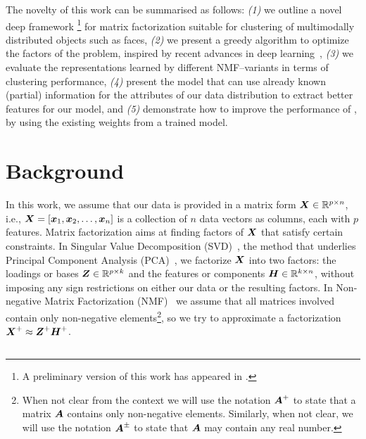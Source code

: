 \documentclass[10pt,journal,compsoc]{IEEEtran}
\begin{document}
The novelty of this work can be summarised as follows: \emph{(1)} we outline a novel deep framework \footnote{A preliminary version of this work has appeared in \citet{Trigeorgis2014}.} for matrix factorization suitable for clustering of multimodally distributed objects such as faces, \emph{(2)} we present a greedy  algorithm to optimize the factors of the \seminmf problem, inspired by recent advances in deep learning~\cite{hinton2006reducing},
\emph{(3)} we evaluate the representations learned by different NMF--variants in terms of clustering performance, \emph{(4)} present the \dwsf{} model that can use already known (partial) information for the attributes of our data distribution to extract better features for our model, and \emph{(5)} demonstrate how to improve the performance of \deepseminmf, by using the existing weights from a trained \dwsf{} model.

\section{Background} \label{sec:related}
\def\algorithmautorefname{Algorithm}
In this work, we assume that our data is provided in a matrix form ${\boldsymbol X}\in \mathbb{R}^{p\times n}$, 
i.e., ${\boldsymbol{X}}=[{\boldsymbol{x}_1}, {\boldsymbol{x}_2}, \ldots, {\boldsymbol{x}_n}]$ is a collection of $n$ data vectors as columns, each with $p$ features. Matrix factorization aims at finding factors of ${\boldsymbol{X}}$ that satisfy certain constraints. In Singular Value Decomposition (SVD)~\cite{golub1970singular}, the method that underlies Principal Component Analysis (PCA)~\cite{wold1987principal}, we factorize ${\boldsymbol X}$ into two factors: the loadings or bases $\boldsymbol Z \in \mathbb{R}^{p\times k}$ and the features or components $\boldsymbol H \in {\mathbb{R}}^{k\times n}$, without imposing any sign restrictions on either our data or the resulting factors. In Non-negative Matrix Factorization (NMF)~\cite{seung2001algorithms} we assume that all matrices involved contain only non-negative elements\footnote{When not clear from the context we will use the notation $\boldsymbol{A}^+$ to state that a matrix ${\boldsymbol{A}}$ contains only non-negative elements. Similarly, when not clear, we will use the notation $\boldsymbol{A}^\pm$ to state that ${\boldsymbol{A}}$ may contain any real number.}, so we try to approximate a factorization ${\boldsymbol{X}^+} \approx {\boldsymbol Z^+ \boldsymbol H^+}$.
\subsection{\seminmf}
\end{document}
